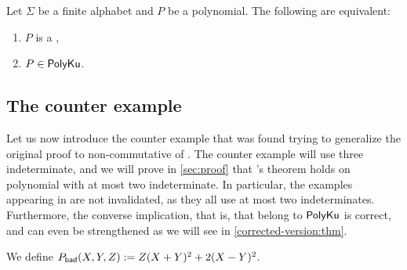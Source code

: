 \begin{faketheorem} 
    \label{karh:thm}
    Let $\Sigma$ be a finite alphabet
    and $P$ be a polynomial. The following are equivalent:
    \begin{enumerate}
        \item $P$ is a ,
        \item $P \in \mathsf{PolyKu}$.
    \end{enumerate}
\end{faketheorem}


\subsection{The counter example}
\label{sec:c-example}


Let us now introduce the counter example that was found trying to generalize
the original proof to non-commutative  of
. The counter example will use three indeterminate, and
we will prove in \cref{sec:proof} that \citeauthor{KARH77}’s theorem holds on
polynomial with at most two indeterminate. In particular, the examples
appearing in \cite{KARH77} are not invalidated, as they all use at most two
indeterminates. Furthermore, the converse implication, that is, that
 belong to $\mathsf{PolyKu}$ is correct, and can
even be strengthened as we will see in \cref{corrected-version:thm}.

\begin{definition}
    \label{def:bad-polynomial}
    We define $P_{\mathsf{bad}}(X,Y,Z) \mathrel{:=} Z (X + Y)^2 + 2 (X - Y)^2$.
\end{definition}

